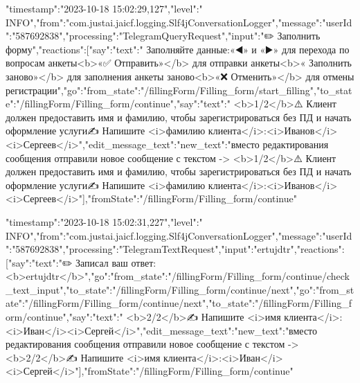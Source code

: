 \documentclass{article}
\begin{document}
\item{
{"timestamp":"2023-10-18 15:02:29,127","level":" INFO","from":"com.justai.jaicf.logging.Slf4jConversationLogger","message":{"userId":"587692838","processing":"TelegramQueryRequest","input":"✏️ Заполнить форму","reactions":[{"say":{"text":" Заполняйте данные\n{}:\n\n«◀️» и «▶️» для перехода по вопросам анкеты\n<b>«✅ Отправить»</b> для отправки анкеты\n<b>« Заполнить заново»</b> для заполнения анкеты заново\n<b>«❌ Отменить»</b> для отмены регистрации"}},{"go":{"from_state":"/fillingForm/Filling_form/start_filling","to_state":"/fillingForm/Filling_form/continue"}},{"say":{"text":" <b>1/2</b>\n\n⚠️ Клиент должен предоставить имя и фамилию, чтобы зарегистрироваться без ПД и начать оформление услуги\n\n✍️ Напишите <i>фамилию клиента</i>\n{}:\n\n<i>Иванов</i>\n<i>Сергеев</i>"}},{"edit_message_text":{"new_text":"вместо редактирования сообщения отправили новое сообщение с текстом ->  <b>1/2</b>\n\n⚠️ Клиент должен предоставить имя и фамилию, чтобы зарегистрироваться без ПД и начать оформление услуги\n\n✍️ Напишите <i>фамилию клиента</i>\n{}:\n\n<i>Иванов</i>\n<i>Сергеев</i>"}}],"fromState":"/fillingForm/Filling_form/continue"}}
}

\item{
{"timestamp":"2023-10-18 15:02:31,227","level":" INFO","from":"com.justai.jaicf.logging.Slf4jConversationLogger","message":{"userId":"587692838","processing":"TelegramTextRequest","input":"ertujdtr","reactions":[{"say":{"text":"✏️ Записал ваш ответ: <b>ertujdtr</b>"}},{"go":{"from_state":"/fillingForm/Filling_form/continue/check_text_input","to_state":"/fillingForm/Filling_form/continue/next"}},{"go":{"from_state":"/fillingForm/Filling_form/continue/next","to_state":"/fillingForm/Filling_form/continue"}},{"say":{"text":" <b>2/2</b>\n\n✍️ Напишите <i>имя клиента</i>\n{}:\n\n<i>Иван</i>\n<i>Сергей</i>"}},{"edit_message_text":{"new_text":"вместо редактирования сообщения отправили новое сообщение с текстом ->  <b>2/2</b>\n\n✍️ Напишите <i>имя клиента</i>\n{}:\n\n<i>Иван</i>\n<i>Сергей</i>"}}],"fromState":"/fillingForm/Filling_form/continue"}}
}
\end{document}
